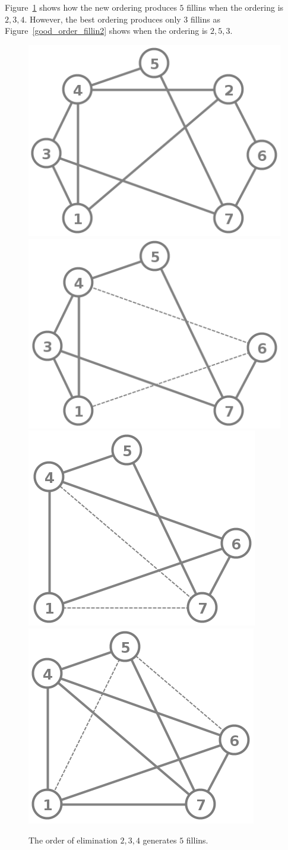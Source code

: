 \documentclass[12pt, oneside]{book}
\begin{document}
Figure~\ref{good_order_fillin} shows how the new ordering produces
$5$ fillins when the ordering is $2, 3, 4$. However, the best ordering produces only $3$ fillins
as Figure~\ref{good_order_fillin2} shows when the ordering is $2, 5, 3$.

\begin{figure}
\centering
   \includegraphics[width=0.4\linewidth]{good_order}
   \hfill
   \includegraphics[width=0.4\linewidth]{good_order_2_removed}
   \includegraphics[width=0.4\linewidth]{good_order_3_2}
   \hfill
   \includegraphics[width=0.4\linewidth]{good_order_4_3_2}
\caption{The order of elimination $2, 3, 4$ generates $5$ fillins.}
\label{good_order_fillin}
\end{figure}
\end{document}
